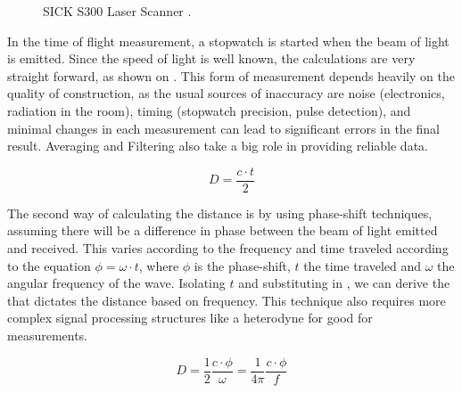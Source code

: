 \begin{figure}
     \centering
     \caption{SICK S300 Laser Scanner \cite{sicks300}.}
     \label{fig:sick_s300}
\end{figure}

In the time of flight measurement, a stopwatch is started when the beam of light is emitted. Since the speed of light is well known, the calculations are very straight forward, as shown on . This form of measurement depends heavily on the quality of construction, as the usual sources of inaccuracy are noise (electronics, radiation in the room), timing (stopwatch precision, pulse detection), and minimal changes in each measurement can lead to significant errors in the final result. Averaging and Filtering also take a big role in providing reliable data.

\begin{equation} \label{eq:d}
D = \frac{c \cdot t}{2}
\end{equation}

The second way of calculating the distance is by using phase-shift techniques, assuming there will be a difference in phase between the beam of light emitted and received. This varies according to the frequency and time traveled according to the equation $\phi = \omega \cdot t$, where $\phi$ is the phase-shift, $t$ the time traveled and $\omega$ the angular frequency of the wave. Isolating $t$ and substituting in , we can derive the  that dictates the distance based on frequency. This technique also requires more complex signal processing structures like a heterodyne for good for measurements.

\begin{equation} \label{eq:d2}
D = \frac{1}{2} \frac{c \cdot \phi}{\omega} = \frac{1}{4 \pi} \frac{c \cdot \phi}{f}
\end{equation}



